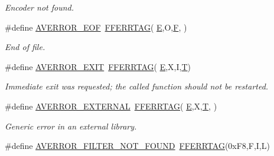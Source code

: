 \begin{DoxyCompactItemize}
\begin{DoxyCompactList}\small\item\em Encoder not found. \end{DoxyCompactList}\item 
\#define \hyperlink{group__lavu__error_gab4faa0afdf35076914824200331defff}{A\+V\+E\+R\+R\+O\+R\+\_\+\+E\+OF}~\hyperlink{group__lavu__error_gacfc46235e91e0770b94f7918013a1034}{F\+F\+E\+R\+R\+T\+AG}( \textquotesingle{}\hyperlink{twolame_2libtwolame_2common_8h_a07484107e6d9fdf38b53edf631d6511d}{E}\textquotesingle{},\textquotesingle{}O\textquotesingle{},\textquotesingle{}\hyperlink{xlftab_8c_a42257a545daf5b7933d6e8f96adc74f2}{F}\textquotesingle{},\textquotesingle{} \textquotesingle{})
\begin{DoxyCompactList}\small\item\em End of file. \end{DoxyCompactList}\item 
\#define \hyperlink{group__lavu__error_ga334ea23fd9e492cd0e718330f2353b6b}{A\+V\+E\+R\+R\+O\+R\+\_\+\+E\+X\+IT}~\hyperlink{group__lavu__error_gacfc46235e91e0770b94f7918013a1034}{F\+F\+E\+R\+R\+T\+AG}( \textquotesingle{}\hyperlink{twolame_2libtwolame_2common_8h_a07484107e6d9fdf38b53edf631d6511d}{E}\textquotesingle{},\textquotesingle{}X\textquotesingle{},\textquotesingle{}I\textquotesingle{},\textquotesingle{}\hyperlink{xmltchar_8h_a16a0f7e7053a679c9bf4289b441a2be7}{T}\textquotesingle{})
\begin{DoxyCompactList}\small\item\em Immediate exit was requested; the called function should not be restarted. \end{DoxyCompactList}\item 
\#define \hyperlink{group__lavu__error_ga9c520e483ba8648495620ffdb4c491f2}{A\+V\+E\+R\+R\+O\+R\+\_\+\+E\+X\+T\+E\+R\+N\+AL}~\hyperlink{group__lavu__error_gacfc46235e91e0770b94f7918013a1034}{F\+F\+E\+R\+R\+T\+AG}( \textquotesingle{}\hyperlink{twolame_2libtwolame_2common_8h_a07484107e6d9fdf38b53edf631d6511d}{E}\textquotesingle{},\textquotesingle{}X\textquotesingle{},\textquotesingle{}\hyperlink{xmltchar_8h_a16a0f7e7053a679c9bf4289b441a2be7}{T}\textquotesingle{},\textquotesingle{} \textquotesingle{})
\begin{DoxyCompactList}\small\item\em Generic error in an external library. \end{DoxyCompactList}\item 
\#define \hyperlink{group__lavu__error_ga2c3b3ab0404e827aeba274b571368e95}{A\+V\+E\+R\+R\+O\+R\+\_\+\+F\+I\+L\+T\+E\+R\+\_\+\+N\+O\+T\+\_\+\+F\+O\+U\+ND}~\hyperlink{group__lavu__error_gacfc46235e91e0770b94f7918013a1034}{F\+F\+E\+R\+R\+T\+AG}(0x\+F8,\textquotesingle{}\+F\textquotesingle{},\textquotesingle{}\+I\textquotesingle{},\textquotesingle{}\+L\textquotesingle{})

\end{DoxyCompactItemize}
